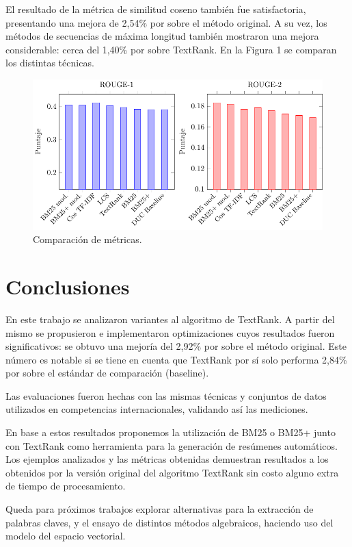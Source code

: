 \documentclass{llncs}
\begin{document}
El resultado de la métrica de similitud coseno también fue satisfactoria, presentando una mejora de 2,54\% por sobre el método original. A su vez, los métodos de secuencias de máxima longitud también mostraron una mejora considerable: cerca del 1,40\% por sobre TextRank. En la Figura 1 se comparan los distintas técnicas.

\begin{figure}[h!]
    \centering
    \includegraphics[width=1\textwidth]{rouge-scores.pdf}
    \caption{Comparación de métricas.}
\end{figure}



\section{Conclusiones}
En este trabajo se analizaron variantes al algoritmo de TextRank. A partir del mismo se propusieron e implementaron optimizaciones cuyos resultados fueron significativos: se obtuvo una mejoría del 2,92\% por sobre el método original. Este número es notable si se tiene en cuenta que TextRank por sí solo performa 2,84\% por sobre el estándar de comparación (baseline).

Las evaluaciones fueron hechas con las mismas técnicas y conjuntos de datos utilizados en competencias internacionales, validando así las mediciones.

En base a estos resultados proponemos la utilización de BM25 o BM25+ junto con TextRank como herramienta para la generación de resúmenes automáticos. Los ejemplos analizados y las métricas obtenidas demuestran resultados a los obtenidos por la versión original del algoritmo TextRank sin costo alguno extra de tiempo de procesamiento. 

Queda para próximos trabajos explorar alternativas para la extracción de palabras claves, y el ensayo de distintos métodos algebraicos, haciendo uso del modelo del espacio vectorial.


{}

\end{document}
